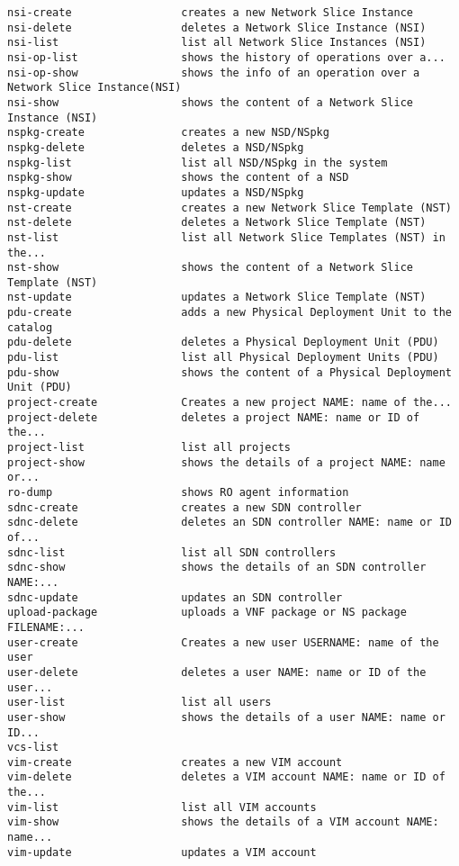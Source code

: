 \begin{lstlisting}
nsi-create                 creates a new Network Slice Instance
nsi-delete                 deletes a Network Slice Instance (NSI)
nsi-list                   list all Network Slice Instances (NSI)
nsi-op-list                shows the history of operations over a...
nsi-op-show                shows the info of an operation over a Network Slice Instance(NSI)
nsi-show                   shows the content of a Network Slice Instance (NSI)
nspkg-create               creates a new NSD/NSpkg
nspkg-delete               deletes a NSD/NSpkg
nspkg-list                 list all NSD/NSpkg in the system
nspkg-show                 shows the content of a NSD
nspkg-update               updates a NSD/NSpkg
nst-create                 creates a new Network Slice Template (NST)
nst-delete                 deletes a Network Slice Template (NST)
nst-list                   list all Network Slice Templates (NST) in the...
nst-show                   shows the content of a Network Slice Template (NST)
nst-update                 updates a Network Slice Template (NST)
pdu-create                 adds a new Physical Deployment Unit to the
catalog
pdu-delete                 deletes a Physical Deployment Unit (PDU)
pdu-list                   list all Physical Deployment Units (PDU)
pdu-show                   shows the content of a Physical Deployment Unit (PDU)
project-create             Creates a new project NAME: name of the...
project-delete             deletes a project NAME: name or ID of the...
project-list               list all projects
project-show               shows the details of a project NAME: name or...
ro-dump                    shows RO agent information
sdnc-create                creates a new SDN controller
sdnc-delete                deletes an SDN controller NAME: name or ID of...
sdnc-list                  list all SDN controllers
sdnc-show                  shows the details of an SDN controller NAME:...
sdnc-update                updates an SDN controller
upload-package             uploads a VNF package or NS package FILENAME:...
user-create                Creates a new user USERNAME: name of the user
user-delete                deletes a user NAME: name or ID of the user...
user-list                  list all users
user-show                  shows the details of a user NAME: name or ID...
vcs-list
vim-create                 creates a new VIM account
vim-delete                 deletes a VIM account NAME: name or ID of the...
vim-list                   list all VIM accounts
vim-show                   shows the details of a VIM account NAME: name...
vim-update                 updates a VIM account

\end{lstlisting}
